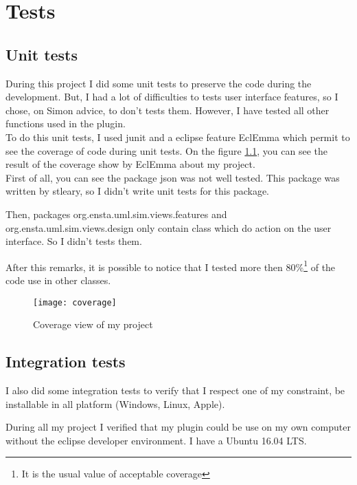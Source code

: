 
\chapter{Tests}
\label{chap:test}

\section{Unit tests}

During this project I did some unit tests to preserve the code during the development. But, I had a lot of difficulties to tests user interface features, so I chose, on Simon advice, to don't tests them. However, I have tested all other functions used in the plugin.
~\\

To do this unit tests, I used junit and a eclipse feature EclEmma which permit to see the coverage of code during unit tests. On the figure \ref{fig:coverage}, you can see the result of the coverage show by EclEmma about my project.
~\\

First of all, you can see the package json was not well tested. This package was written by stleary\cite{json}, so I didn't write unit tests for this package.

Then, packages org.ensta.uml.sim.views.features and org.ensta.uml.sim.views.design only contain class which do action on the user interface. So I didn't tests them.

After this remarks, it is possible to notice that I tested more then 80\%\footnote{It is the usual value of acceptable coverage} of the code use in other classes.


\begin{figure}[h]
  \centering
  \texttt{[image: coverage]}
  \caption{Coverage view of my project}
  \label{fig:coverage}
\end{figure}

\section{Integration tests}

I also did some integration tests to verify that I respect one of my constraint, be installable  in all platform (Windows, Linux, Apple).

During all my project I verified that my plugin could be use on my own computer without the eclipse developer environment. I have a Ubuntu 16.04 LTS.

